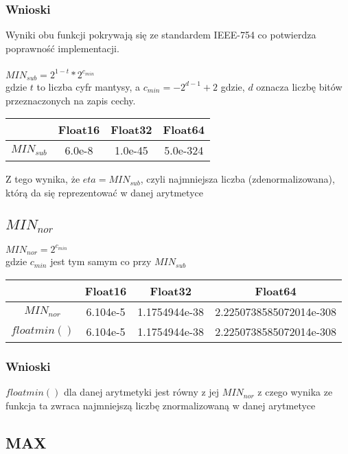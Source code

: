 \documentclass{article}
\begin{document}
\subsubsection{Wnioski}
    Wyniki obu funkcji pokrywają się ze standardem IEEE-754 co potwierdza poprawność implementacji.
\\
\\
    $MIN_{sub} = 2^{1-t}*2^{c_{min}}$\\
    gdzie $t$ to liczba cyfr mantysy, a $c_{min}=-2^{d-1}+2$ gdzie, $d$ oznacza liczbę bitów przeznaczonych na zapis cechy.
        \begin{center}
        \begin{tabular}{|c|c|c|c|}
        \hline
             & Float16 & Float32 & Float64 \\
            \hline
            $MIN_{sub}$ & 6.0e-8 & 1.0e-45 & 5.0e-324\\
        \hline
        \end{tabular}
    \end{center}
    Z tego wynika, że $eta = MIN_{sub}$, czyli najmniejsza liczba (zdenormalizowana), którą da się reprezentować w danej arytmetyce

\subsection{$MIN_{nor}$}
    $MIN_{nor} = 2^{c_{min}}$\\
    gdzie $c_{min}$ jest tym samym co przy $MIN_{sub}$ 
        \begin{center}
        \begin{tabular}{|c|c|c|c|}
        \hline
             & Float16 & Float32 & Float64 \\
            \hline
            $MIN_{nor}$ & 6.104e-5 & 1.1754944e-38 & 2.2250738585072014e-308\\
            \hline
            $floatmin()$ & 6.104e-5 & 1.1754944e-38 & 2.2250738585072014e-308\\
        \hline
        \end{tabular}
    \end{center}
\subsubsection{Wnioski}
    $floatmin()$ dla danej arytmetyki jest równy z jej $MIN_{nor}$ z czego wynika ze funkcja ta zwraca najmniejszą liczbę znormalizowaną w danej arytmetyce

\subsection{MAX}
\end{document}
